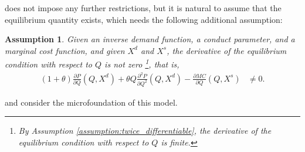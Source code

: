 \documentclass[11pt, a4paper]{article}
\newtheorem{assumption}{Assumption}
\theoremstyle{remark}
\begin{document}
\citet{lau1982identifying} does not impose any further restrictions, but it is natural to assume that the equilibrium quantity exists, which needs the following additional assumption:
\begin{assumption}\label{assumption:unique_equilibrium}
    Given an inverse demand function, a conduct parameter, and a marginal cost function, and given $X^{d}$ and $X^{s}$, the derivative of the equilibrium condition with respect to $Q$ is not zero \footnote{By Assumption \ref{assumption:twice_differentiable}, the derivative of the equilibrium condition with respect to $Q$ is finite.}, that is,
    \begin{align}
        (1+\theta)\frac{\partial P}{\partial Q}(Q, X^{d}) + \theta Q\frac{\partial^2 P}{\partial Q^2}(Q, X^{d}) - \frac{\partial MC}{\partial Q}(Q, X^{s}) & \ne 0.
    \end{align}
\end{assumption}



\citet{adachiMicrofoundation2023} and \citet{weylPassThrough2013} consider the microfoundation of this model.




\end{document}

